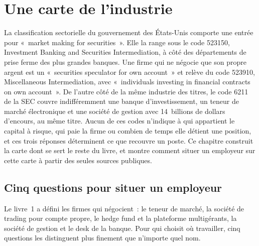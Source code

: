 \chapter{Une carte de l'industrie}\label{ch:in:a-map-of-the-industry}

La classification sectorielle du gouvernement des États-Unis comporte une entrée pour «~market making for securities~». Elle la range
sous le code 523150, Investment Banking and Securities Intermediation, à côté des départements de prise ferme des plus grandes
banques. Une firme qui ne négocie que son propre argent est un «~securities speculator for own account~» et relève du code 523910,
Miscellaneous Intermediation, avec «~individuals investing in financial contracts on own account~». De l'autre côté de
la même industrie des titres, le code 6211 de la SEC couvre indifféremment une banque d'investissement, un teneur de marché électronique et une société de
gestion avec 14~billions de dollars d'encours, au même titre. Aucun de ces codes n'indique à qui appartient le capital à risque, qui paie la firme ou combien de temps
elle détient une position, et ces trois réponses déterminent ce que recouvre un poste. Ce chapitre construit la carte dont se sert le reste du
livre, et montre comment situer un employeur sur cette carte à partir des seules sources publiques.

\section{Cinq questions pour situer un employeur}

Le livre~1 a défini les firmes qui négocient~: le teneur de marché, la société de trading pour compte propre, le hedge fund et la
plateforme multigérants, la société de gestion et le desk de la banque. Pour qui choisit où travailler, cinq
questions les distinguent plus finement que n'importe quel nom.

